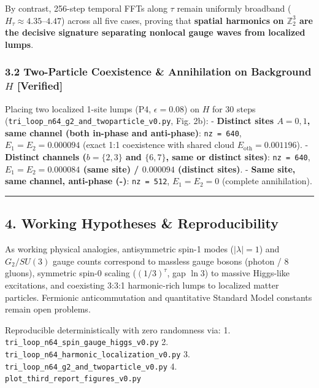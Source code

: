 \documentclass[
  a4paper,
]{article}
\begin{document}
By contrast, 256-step temporal FFTs along \(\tau\) remain uniformly
broadband (\(H_\tau \approx 4.35\text{--}4.47\)) across all five cases,
proving that \textbf{spatial harmonics on \(\mathbb{Z}_2^3\) are the
decisive signature separating nonlocal gauge waves from localized
lumps}.

\subsubsection{\texorpdfstring{3.2 Two-Particle Coexistence \&
Annihilation on Background \(H\)
{[}Verified{]}}{3.2 Two-Particle Coexistence \& Annihilation on Background H {[}Verified{]}}}\label{two-particle-coexistence-annihilation-on-background-h-verified}

Placing two localized 1-site lumps (P4, \(\epsilon = 0.08\)) on \(H\)
for 30 steps (\texttt{tri\_\allowbreak{}loop\_\allowbreak{}n64\_\allowbreak{}g2\_\allowbreak{}and\_\allowbreak{}twoparticle\_\allowbreak{}v0.py}, Fig.
2b): - \textbf{Distinct sites \(A = 0, 1\), same channel (both in-phase
and anti-phase)}: \texttt{nz\ =\ 640}, \textbf{\(E_1 = E_2 = 0.000094\)}
(exact 1:1 coexistence with shared cloud
\(E_{\mathrm{oth}} = 0.001196\)). - \textbf{Distinct channels
(\(b=\{2,3\}\) and \(\{6,7\}\), same or distinct sites)}:
\texttt{nz\ =\ 640}, \textbf{\(E_1 = E_2 = 0.000084\) (same site) /
\(0.000094\) (distinct sites)}. - \textbf{Same site, same channel,
anti-phase (-)}: \texttt{nz\ =\ 512}, \(E_1 = E_2 = 0\) (complete
annihilation).

\begin{center}\rule{0.5\linewidth}{0.5pt}\end{center}

\subsection{4. Working Hypotheses \&
Reproducibility}\label{working-hypotheses-reproducibility}

As working physical analogies, antisymmetric spin-1 modes
(\(|\lambda|=1\)) and \(G_2/SU(3)\) gauge counts correspond to massless
gauge bosons (photon / 8 gluons), symmetric spin-0 scaling
(\((1/3)^\tau\), gap \(\ln 3\)) to massive Higgs-like excitations, and
coexisting 3:3:1 harmonic-rich lumps to localized matter particles.
Fermionic anticommutation and quantitative Standard Model constants
remain open problems.

Reproducible deterministically with zero randomness via: 1.
\texttt{tri\_\allowbreak{}loop\_\allowbreak{}n64\_\allowbreak{}spin\_\allowbreak{}gauge\_\allowbreak{}higgs\_\allowbreak{}v0.py} 2.
\texttt{tri\_\allowbreak{}loop\_\allowbreak{}n64\_\allowbreak{}harmonic\_\allowbreak{}localization\_\allowbreak{}v0.py} 3.
\texttt{tri\_\allowbreak{}loop\_\allowbreak{}n64\_\allowbreak{}g2\_\allowbreak{}and\_\allowbreak{}twoparticle\_\allowbreak{}v0.py} 4.
\texttt{plot\_\allowbreak{}third\_\allowbreak{}report\_\allowbreak{}figures\_\allowbreak{}v0.py}
\end{document}

